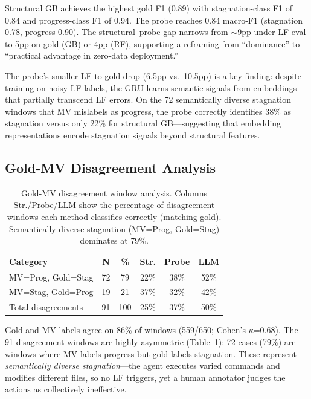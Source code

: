\documentclass[11pt,a4paper]{article}
\begin{document}
Structural GB achieves the highest gold F1 (0.89) with stagnation-class F1 of 0.84 and progress-class F1 of 0.94.
The probe reaches 0.84 macro-F1 (stagnation 0.78, progress 0.90).
The structural--probe gap narrows from $\sim$9pp under LF-eval to 5pp on gold (GB) or 4pp (RF), supporting a reframing from ``dominance'' to ``practical advantage in zero-data deployment.''

The probe's smaller LF-to-gold drop (6.5pp vs.\ 10.5pp) is a key finding: despite training on noisy LF labels, the GRU learns semantic signals from embeddings that partially transcend LF errors.
On the 72 semantically diverse stagnation windows that MV mislabels as progress, the probe correctly identifies 38\% as stagnation versus only 22\% for structural GB---suggesting that embedding representations encode stagnation signals beyond structural features.

\subsection{Gold-MV Disagreement Analysis}
\label{sec:gold-disagree}

\begin{table}[t]
\centering
\small
\begin{tabular}{lccccc}
\toprule
\textbf{Category} & \textbf{N} & \textbf{\%} & \textbf{Str.} & \textbf{Probe} & \textbf{LLM} \\
\midrule
MV=Prog, Gold=Stag & 72 & 79 & 22\% & 38\% & 52\% \\
MV=Stag, Gold=Prog & 19 & 21 & 37\% & 32\% & 42\% \\
\midrule
Total disagreements & 91 & 100 & 25\% & 37\% & 50\% \\
\bottomrule
\end{tabular}
\caption{Gold-MV disagreement window analysis. Columns Str./Probe/LLM show the percentage of disagreement windows each method classifies correctly (matching gold). Semantically diverse stagnation (MV=Prog, Gold=Stag) dominates at 79\%.}
\label{tab:disagree}
\end{table}

Gold and MV labels agree on 86\% of windows (559/650; Cohen's $\kappa$=0.68).
The 91 disagreement windows are highly asymmetric (Table~\ref{tab:disagree}): 72 cases (79\%) are windows where MV labels progress but gold labels stagnation.
These represent \emph{semantically diverse stagnation}---the agent executes varied commands and modifies different files, so no LF triggers, yet a human annotator judges the actions as collectively ineffective.
\end{document}
